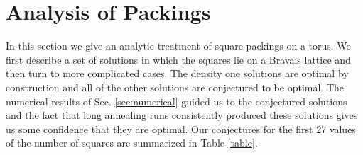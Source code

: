 \section{Analysis of Packings}
\label{sec:analytics}

In this section we give an analytic treatment of square packings on a torus.  We first describe a set of solutions in which the squares lie on a Bravais lattice and then turn to more complicated cases. The density one solutions are optimal by construction and all of the other solutions are conjectured to be optimal. The numerical results of Sec. \ref{sec:numerical} guided us to the conjectured solutions and the fact that long annealing runs consistently produced these solutions gives us some confidence that they are optimal.  Our conjectures for the first 27 values of the number of squares are summarized in Table \ref{table}.

